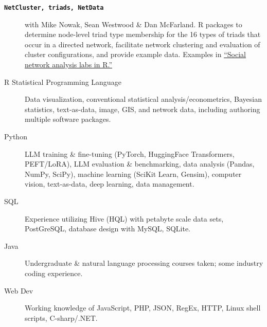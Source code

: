 \documentclass[letterpaper,11pt]{article}
\newcommand{\resheading}[1]{\vspace{4pt}{\large
\colorbox{mygrey}{\begin{minipage}{\textwidth}{\textbf{#1
\vphantom{p\^{E}}}}\end{minipage}}}\vspace{4pt}}
\begin{document}
\begin{description}
\item[\large{\textbf{\texttt{NetCluster, triads, NetData}}}] with Mike Nowak, Sean Westwood \& Dan McFarland. R packages to determine node-level triad type membership for the 16 types of triads that occur in a directed network, facilitate network clustering and evaluation of cluster configurations, and provide example data.  Examples in \href{https://web.archive.org/web/20210303125220/https://sna.stanford.edu/rlabs.php}{``Social network analysis labs in R.''} 

%

\end{description}

\resheading{Computing}
\begin{description}
\item[R Statistical Programming Language] Data visualization, conventional statistical analysis/econometrics, Bayesian statistics, text-as-data, image, GIS, and network data, including authoring multiple software packages.
\item[Python] LLM training \& fine-tuning (PyTorch, HuggingFace Transformers, PEFT/LoRA), LLM evaluation \& benchmarking, data analysis (Pandas, NumPy, SciPy), machine learning (SciKit Learn, Gensim), computer vision, text-as-data, deep learning, data management.
\item[SQL] Experience utilizing Hive (HQL) with petabyte scale data sets, PostGreSQL, database design with MySQL, SQLite.
\item[Java] Undergraduate \& natural language processing courses taken; some industry coding experience.
\item[Web Dev] Working knowledge of JavaScript, PHP, JSON, RegEx, HTTP, Linux shell scripts, C-sharp/.NET. 
\end{description}
\end{document}
